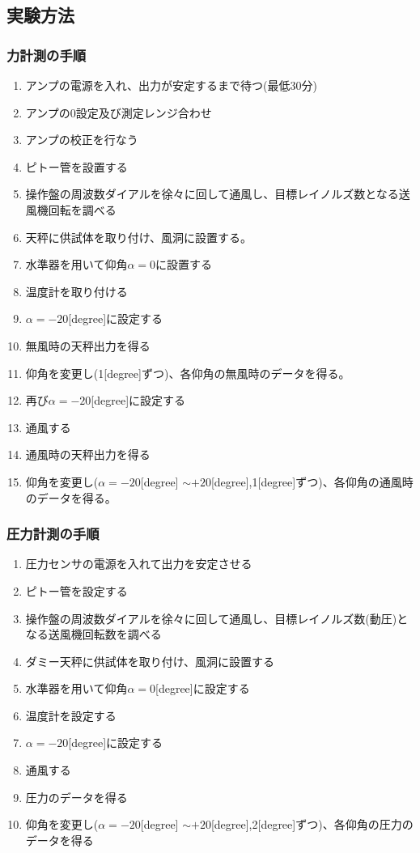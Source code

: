 \documentclass[a4j,twoside,openright,11pt]{jarticle}
\begin{document}
\subsection{実験方法}
\subsubsection{力計測の手順}

\begin{enumerate}
\item アンプの電源を入れ、出力が安定するまで待つ(最低30分)
\item アンプの0設定及び測定レンジ合わせ
\item アンプの校正を行なう
\item ピトー管を設置する
\item 操作盤の周波数ダイアルを徐々に回して通風し、目標レイノルズ数となる送風機回転を調べる
\item 天秤に供試体を取り付け、風洞に設置する。
\item 水準器を用いて仰角$\alpha = 0$に設置する
\item 温度計を取り付ける
\item $\alpha = -20$[degree]に設定する
\item 無風時の天秤出力を得る
\item 仰角を変更し(1[degree]ずつ)、各仰角の無風時のデータを得る。
\item 再び$\alpha = -20$[degree]に設定する
\item 通風する
\item 通風時の天秤出力を得る
\item 仰角を変更し($\alpha = -20$[degree] $\sim +20$[degree],1[degree]ずつ)、各仰角の通風時のデータを得る。
\end{enumerate}

\subsubsection{圧力計測の手順}

\begin{enumerate}
\item 圧力センサの電源を入れて出力を安定させる
\item ピトー管を設定する
\item 操作盤の周波数ダイアルを徐々に回して通風し、目標レイノルズ数(動圧)となる送風機回転数を調べる
\item ダミー天秤に供試体を取り付け、風洞に設置する
\item 水準器を用いて仰角$\alpha = 0$[degree]に設定する
\item 温度計を設定する
\item $\alpha = -20$[degree]に設定する
\item 通風する
\item 圧力のデータを得る
\item 仰角を変更し($\alpha = -20$[degree] $\sim +20$[degree],2[degree]ずつ)、各仰角の圧力のデータを得る
\end{enumerate}
\end{document}
